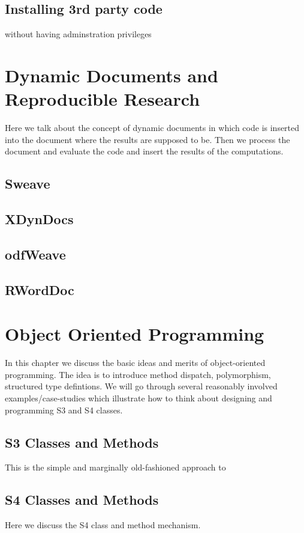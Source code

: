 \documentclass[11pt]{book}
\begin{document}
 \section{Installing 3rd party code}
   without having adminstration privileges

\chapter{Dynamic Documents and Reproducible Research}

Here we talk about the concept of dynamic documents 
in which code is inserted into the document where the results
are supposed to be. Then we process the document and 
evaluate the code and insert the results of the computations.
\section{Sweave}
\section{XDynDocs}
\section{odfWeave}
\section{RWordDoc}


\chapter{Object Oriented Programming}
In this chapter we discuss the basic ideas and merits of
object-oriented programming.  The idea is to introduce method
dispatch, polymorphism, structured type defintions.
We will go through several reasonably involved examples/case-studies
which illustrate how to think about designing and programming S3 and
S4 classes.

\section{S3 Classes and Methods}
 This is the simple and marginally old-fashioned approach to 
 
   
 \section{S4 Classes and Methods}
 Here we discuss the S4 class and method mechanism.
\end{document}
